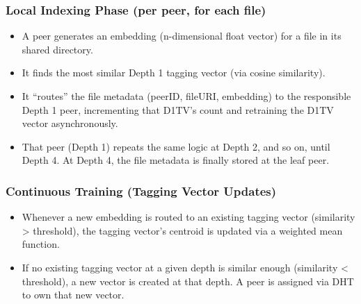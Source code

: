 \documentclass[11pt,a4paper]{article}
\begin{document}
\subsubsection{Local Indexing Phase (per peer, for each file)}
\begin{itemize}
    \item A peer generates an embedding (n-dimensional float vector) for a file in its shared directory.
    \item It finds the most similar Depth 1 tagging vector (via cosine similarity).
    \item It “routes” the file metadata (peerID, fileURI, embedding) to the responsible Depth 1 peer, incrementing that D1TV’s count and retraining the D1TV vector asynchronously.
    \item That peer (Depth 1) repeats the same logic at Depth 2, and so on, until Depth 4. At Depth 4, the file metadata is finally stored at the leaf peer.
\end{itemize}

\subsubsection{Continuous Training (Tagging Vector Updates)}
\begin{itemize}
    \item Whenever a new embedding is routed to an existing tagging vector (similarity > threshold), the tagging vector’s centroid is updated via a weighted mean function.
    \item If no existing tagging vector at a given depth is similar enough (similarity < threshold), a new vector is created at that depth. A peer is assigned via DHT to own that new vector.
\end{itemize}
\end{document}
